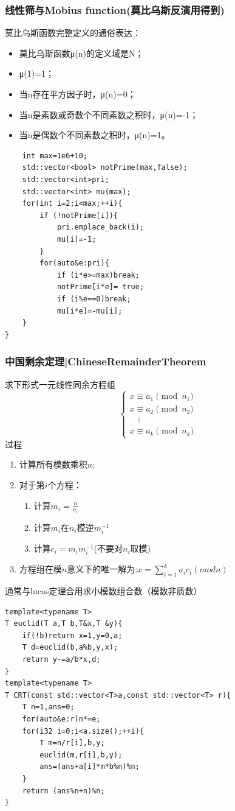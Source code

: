 \documentclass[UTF8,twoside]{ctexart}
\begin{document}
\subsubsection{线性筛与Mobius function(莫比乌斯反演用得到)}
莫比乌斯函数完整定义的通俗表达：
\begin{itemize}
    \item 莫比乌斯函数μ(n)的定义域是N；
    \item μ(1)=1；
    \item 当n存在平方因子时，μ(n)=0；
    \item 当n是素数或奇数个不同素数之积时，μ(n)=-1；
    \item 当n是偶数个不同素数之积时，μ(n)=1。
\end{itemize}
\begin{lstlisting}
    int max=1e6+10;
    std::vector<bool> notPrime(max,false);
    std::vector<int>pri;
    std::vector<int> mu(max);
    for(int i=2;i<max;++i){
        if (!notPrime[i]){
            pri.emplace_back(i);
            mu[i]=-1;
        }
        for(auto&e:pri){
            if (i*e>=max)break;
            notPrime[i*e]= true;
            if (i%e==0)break;
            mu[i*e]=-mu[i];
    }
}
\end{lstlisting}
\subsubsection{中国剩余定理|ChineseRemainderTheorem}
求下形式一元线性同余方程组
$$
\begin{cases}
    x \equiv a_1 \pmod{n_1} \\
    x \equiv a_2 \pmod{n_2} \\
    \quad \vdots \\
    x \equiv a_k \pmod{n_k}
\end{cases}
$$
过程
\begin{enumerate}
    \item 计算所有模数乘积$n$;
    \item 对于第$i$个方程：
        \begin{enumerate}
            \item 计算$m_i = \frac{n}{n_i}$
            \item 计算$m_i$在$n_i$模逆$m_i^{-1}$
            \item 计算$c_i=m_im_i^{-1}$(不要对$n_i$取模)
        \end{enumerate}
    \item 方程组在模$n$意义下的唯一解为:$x=\sum_{i=1}^{k}a_ic_i(mod n)$
\end{enumerate}
通常与lucas定理合用求小模数组合数（模数非质数）
\begin{lstlisting}
template<typename T>
T euclid(T a,T b,T&x,T &y){
    if(!b)return x=1,y=0,a;
    T d=euclid(b,a%b,y,x);
    return y-=a/b*x,d;
}
template<typename T>
T CRT(const std::vector<T>a,const std::vector<T> r){
    T n=1,ans=0;
    for(auto&e:r)n*=e;
    for(i32 i=0;i<a.size();++i){
        T m=n/r[i],b,y;
        euclid(m,r[i],b,y);
        ans=(ans+a[i]*m*b%n)%n;
    }
    return (ans%n+n)%n;
}
\end{lstlisting}
\end{document}
